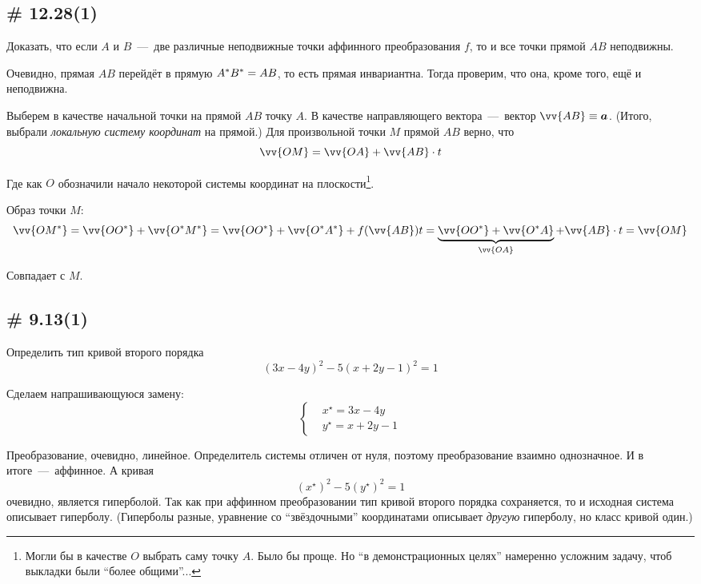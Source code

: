 \documentclass[a4paper,12pt]{article}
\begin{document}
  
  \subsection{\# 12.28(1)}
  
  Доказать, что если $A$ и $B$~---~две различные неподвижные точки аффинного преобразования $f$, то и все точки прямой $AB$ неподвижны.
  
  \begin{solution}
    Очевидно, прямая $AB$ перейдёт в прямую $A^*B^* \hm= AB$, то есть прямая инвариантна.
    Тогда проверим, что она, кроме того, ещё и неподвижна.
    
    Выберем в качестве начальной точки на прямой $AB$ точку $A$.
    В качестве направляющего вектора~---~вектор $\vv{AB} \hm\equiv \bds a$.
    (Итого, выбрали \emph{локальную систему координат} на прямой.)
    Для произвольной точки $M$ прямой $AB$ верно, что
    \[
      \vv{OM} = \vv{OA} + \vv{AB} \cdot t
    \]
    
    Где как $O$ обозначили начало некоторой системы координат на плоскости\footnote{Могли бы в качестве $O$ выбрать саму точку $A$. Было бы проще. Но ``в демонстрационных целях'' намеренно усложним задачу, чтоб выкладки были ``более общими''...}.
    
    Образ точки $M$:
    \[
      \vv{OM^*} = \vv{OO^*} + \vv{O^*M^*} = \vv{OO^*} + \vv{O^*A^*} + f(\vv{AB}) t
        = \underbrace{\vv{OO^*} + \vv{O^*A}}_{\vv{OA}} + \vv{AB} \cdot t
        = \vv{OM}
    \]
    
    Совпадает с $M$.
  \end{solution}


  \subsection{\# 9.13(1)}
  
  Определить тип кривой второго порядка
  \[
    (3x - 4y)^2 - 5(x + 2y - 1)^2 = 1
  \]
  
  \begin{solution}
    Сделаем напрашивающуюся замену:
    \[
      \left\{
        \begin{aligned}
          &x^\star = 3x - 4y\\
          &y^\star = x + 2y - 1
        \end{aligned}
      \right.
    \]
    
    Преобразование, очевидно, линейное.
    Определитель системы отличен от нуля, поэтому преобразование взаимно однозначное.
    И в итоге~---~аффинное.
    А кривая
    \[
      (x^\star)^2 - 5(y^\star)^2 = 1
    \]
    очевидно, является гиперболой.
    Так как при аффинном преобразовании тип кривой второго порядка сохраняется, то и исходная система описывает гиперболу.
    (Гиперболы разные, уравнение со ``звёздочными'' координатами описывает \emph{другую} гиперболу, но класс кривой один.)
  \end{solution}
  
\end{document}
